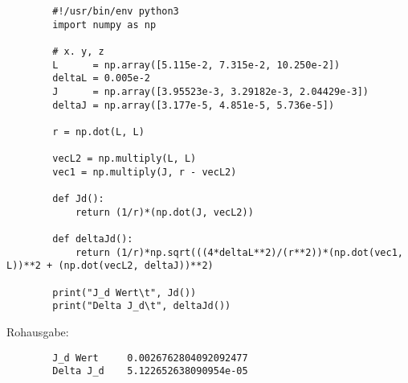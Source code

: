    \begin{verbatim}
        #!/usr/bin/env python3
        import numpy as np

        # x. y, z
        L      = np.array([5.115e-2, 7.315e-2, 10.250e-2])
        deltaL = 0.005e-2
        J      = np.array([3.95523e-3, 3.29182e-3, 2.04429e-3])
        deltaJ = np.array([3.177e-5, 4.851e-5, 5.736e-5])

        r = np.dot(L, L)

        vecL2 = np.multiply(L, L)
        vec1 = np.multiply(J, r - vecL2)

        def Jd():
            return (1/r)*(np.dot(J, vecL2))

        def deltaJd():
            return (1/r)*np.sqrt(((4*deltaL**2)/(r**2))*(np.dot(vec1, L))**2 + (np.dot(vecL2, deltaJ))**2)

        print("J_d Wert\t", Jd())
        print("Delta J_d\t", deltaJd())
    \end{verbatim}

    Rohausgabe:
    \begin{verbatim}
        J_d Wert     0.0026762804092092477
        Delta J_d    5.122652638090954e-05
    \end{verbatim}